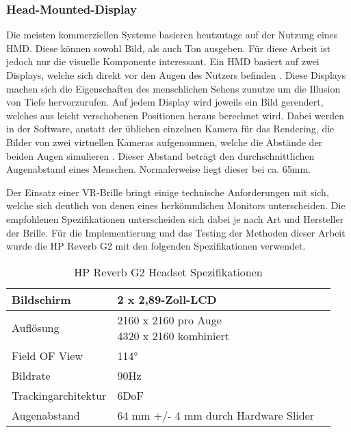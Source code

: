 \subsubsection{Head-Mounted-Display}
Die meisten kommerziellen Systeme basieren heutzutage auf der Nutzung eines HMD.
Diese können sowohl Bild, als auch Ton ausgeben. Für diese Arbeit ist jedoch nur die visuelle Komponente interessant.
Ein HMD basiert auf zwei Displays, welche sich direkt vor den Augen des Nutzers befinden \parencite{Sutherland1968}.
Diese Displays machen sich die Eigenschaften des menschlichen Sehens zunutze um die Illusion von Tiefe hervorzurufen.
Auf jedem Display wird jeweils ein Bild gerendert, welches aus leicht verschobenen Positionen heraus berechnet wird.
Dabei werden in der Software, anstatt der üblichen einzelnen Kamera für das Rendering, die Bilder von zwei virtuellen Kameras aufgenommen,
welche die Abstände der beiden Augen simulieren \parencite{NVIDIA2010}. Dieser Abstand beträgt den durchschnittlichen
Augenabstand eines Menschen. Normalerweise liegt dieser bei ca. 65mm.

Der Einsatz einer VR-Brille bringt einige technische Anforderungen mit sich, welche sich deutlich
von denen eines herkömmlichen Monitors unterscheiden. Die empfohlenen Spezifikationen unterscheiden sich dabei je nach Art und
Hersteller der Brille. Für die Implementierung und das Testing der Methoden dieser Arbeit wurde die HP Reverb G2 mit den folgenden
Spezifikationen verwendet.


\begin{table}[h]
	\renewcommand*{\arraystretch}{2}
	\setlength{\tabcolsep}{1.5cm}
	\begin{tabular}{lll}
		\hspace{-1.5cm}Bildschirm          & 2 x 2,89-Zoll-LCD                    \\ \hline
		\hspace{-1.5cm}Auflösung           & \makecell[l]{2160 x 2160 pro Auge    \\4320 x 2160 kombiniert}  \\ \hline
		\hspace{-1.5cm}Field OF View       & \raisebox{-0.6ex}{\~{ }}114°         \\ \hline
		\hspace{-1.5cm}Bildrate            & 90Hz                                 \\ \hline
		\hspace{-1.5cm}Trackingarchitektur & 6DoF                                 \\ \hline
		\hspace{-1.5cm}Augenabstand        & 64 mm +/- 4 mm durch Hardware Slider \\ \hline
	\end{tabular}
	\caption[Tabelle 1]{HP Reverb G2 Headset Spezifikationen \parencite{HPG2}}
\end{table}








